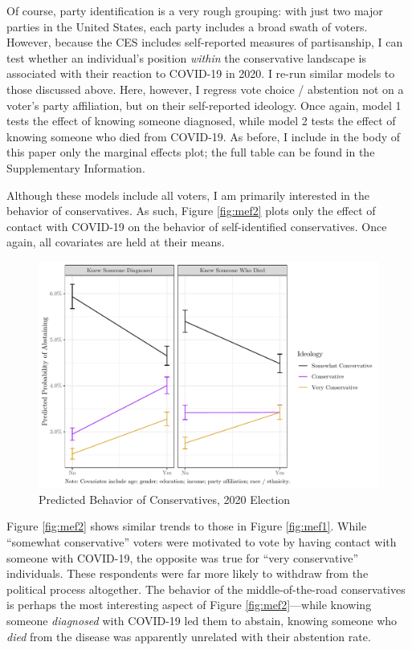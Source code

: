 \documentclass[
  12pt,
]{article}
\begin{document}
Of course, party identification is a very rough grouping: with just two major parties in the United States, each party includes a broad swath of voters. However, because the CES includes self-reported measures of partisanship, I can test whether an individual's position \emph{within} the conservative landscape is associated with their reaction to COVID-19 in 2020. I re-run similar models to those discussed above. Here, however, I regress vote choice / abstention not on a voter's party affiliation, but on their self-reported ideology. Once again, model 1 tests the effect of knowing someone diagnosed, while model 2 tests the effect of knowing someone who died from COVID-19. As before, I include in the body of this paper only the marginal effects plot; the full table can be found in the Supplementary Information.

Although these models include all voters, I am primarily interested in the behavior of conservatives. As such, Figure \ref{fig:mef2} plots only the effect of contact with COVID-19 on the behavior of self-identified conservatives. Once again, all covariates are held at their means.

\begin{figure}[H]

{\centering \includegraphics{theory_paper_files/figure-latex/mef2-c-1} 

}

\caption{\label{fig:mef2}Predicted Behavior of Conservatives, 2020 Election}\label{fig:mef2-c}
\end{figure}

Figure \ref{fig:mef2} shows similar trends to those in Figure \ref{fig:mef1}. While ``somewhat conservative'' voters were motivated to vote by having contact with someone with COVID-19, the opposite was true for ``very conservative'' individuals. These respondents were far more likely to withdraw from the political process altogether. The behavior of the middle-of-the-road conservatives is perhaps the most interesting aspect of Figure \ref{fig:mef2}---while knowing someone \emph{diagnosed} with COVID-19 led them to abstain, knowing someone who \emph{died} from the disease was apparently unrelated with their abstention rate.
\end{document}
